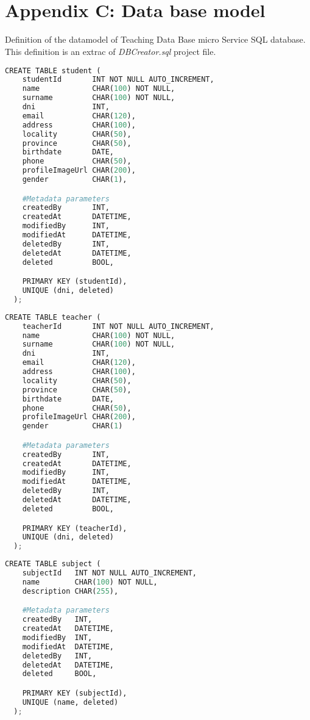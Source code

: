 \section{\\Appendix C: Data base model}

Definition of the datamodel of Teaching Data Base micro Service SQL
database. This definition is an extrac of \textit{DBCreator.sql}
project file.


\begin{lstlisting}[language=python,frame=none]
  CREATE TABLE student (
    studentId       INT NOT NULL AUTO_INCREMENT,
    name            CHAR(100) NOT NULL,
    surname         CHAR(100) NOT NULL,
    dni             INT,
    email           CHAR(120),
    address         CHAR(100),
    locality        CHAR(50),
    province        CHAR(50),
    birthdate       DATE,
    phone           CHAR(50),
    profileImageUrl CHAR(200),
    gender          CHAR(1),

    #Metadata parameters
    createdBy       INT,
    createdAt       DATETIME,
    modifiedBy      INT,
    modifiedAt      DATETIME,
    deletedBy       INT,
    deletedAt       DATETIME,
    deleted         BOOL,

    PRIMARY KEY (studentId),
    UNIQUE (dni, deleted)
  );
\end{lstlisting}

\begin{lstlisting}[language=python,frame=none]
  CREATE TABLE teacher (
    teacherId       INT NOT NULL AUTO_INCREMENT,
    name            CHAR(100) NOT NULL,
    surname         CHAR(100) NOT NULL,
    dni             INT,
    email           CHAR(120),
    address         CHAR(100),
    locality        CHAR(50),
    province        CHAR(50),
    birthdate       DATE,
    phone           CHAR(50),
    profileImageUrl CHAR(200),
    gender          CHAR(1)

    #Metadata parameters
    createdBy       INT,
    createdAt       DATETIME,
    modifiedBy      INT,
    modifiedAt      DATETIME,
    deletedBy       INT,
    deletedAt       DATETIME,
    deleted         BOOL,

    PRIMARY KEY (teacherId),
    UNIQUE (dni, deleted)
  );
\end{lstlisting}


\begin{lstlisting}[language=python,frame=none]
  CREATE TABLE subject (
    subjectId   INT NOT NULL AUTO_INCREMENT,
    name        CHAR(100) NOT NULL,
    description CHAR(255),

    #Metadata parameters
    createdBy   INT,
    createdAt   DATETIME,
    modifiedBy  INT,
    modifiedAt  DATETIME,
    deletedBy   INT,
    deletedAt   DATETIME,
    deleted     BOOL,

    PRIMARY KEY (subjectId),
    UNIQUE (name, deleted)
  );
\end{lstlisting}

